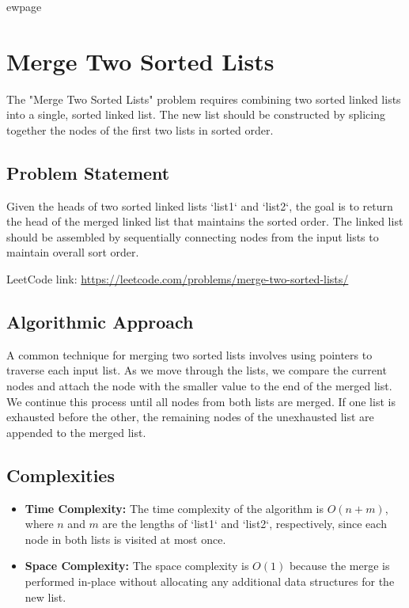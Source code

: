 
ewpage
\chapter{Merge Two Sorted Lists}
\label{chap:Merge_Two_Sorted_Lists}
The "Merge Two Sorted Lists" problem requires combining two sorted linked lists into a single, sorted linked list. The new list should be constructed by splicing together the nodes of the first two lists in sorted order.

\section*{Problem Statement}
Given the heads of two sorted linked lists `list1` and `list2`, the goal is to return the head of the merged linked list that maintains the sorted order. The linked list should be assembled by sequentially connecting nodes from the input lists to maintain overall sort order.

LeetCode link: \href{https://leetcode.com/problems/merge-two-sorted-lists/}{https://leetcode.com/problems/merge-two-sorted-lists/}

\section*{Algorithmic Approach}
A common technique for merging two sorted lists involves using pointers to traverse each input list. As we move through the lists, we compare the current nodes and attach the node with the smaller value to the end of the merged list. We continue this process until all nodes from both lists are merged. If one list is exhausted before the other, the remaining nodes of the unexhausted list are appended to the merged list.

\section*{Complexities}
\begin{itemize}
	\item \textbf{Time Complexity:} The time complexity of the algorithm is \(O(n + m)\), where \(n\) and \(m\) are the lengths of `list1` and `list2`, respectively, since each node in both lists is visited at most once.
	\item \textbf{Space Complexity:} The space complexity is \(O(1)\) because the merge is performed in-place without allocating any additional data structures for the new list.
\end{itemize}


